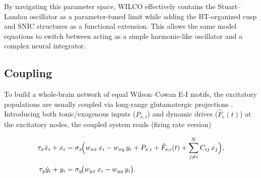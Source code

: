 \documentclass[11pt]{article}
\numberwithin{equation}{section}
\begin{document}
{By navigating this parameter space, WILCO effectively contains the Stuart–Landau oscillator as a parameter-tuned limit while adding the BT-organized cusp and SNIC structures as a functional extension. This allows the same model equations to switch between acting as a simple harmonic-like oscillator and a complex neural integrator.
}



\subsection{Coupling}

To build a whole-brain network of equal Wilson–Cowan E-I  motifs,  the excitatory populations are usually coupled via long-range glutamatergic projections \cite{castaldo2023multi}.  Introducing both tonic/exogenous inputs ($P_{x,i}$) and dynamic drives ($\hat F_e(t)$) at the excitatory nodes, the coupled system reads (firing rate version)
\begin{tcolorbox}[
  colback=gray!5,
  colframe=gray!5, %
  boxrule=0pt,
  enhanced, sharp corners,
  left=4pt, right=4pt, top=3pt, bottom=3pt,
  boxsep=2pt,
  before skip=6pt, after skip=6pt
]
\begin{equation} 
\begin{aligned}
  \tau_x \dot{x}_i + x_i 
    &= \sigma_x\!\Bigl(
         w_{xx}\,x_i 
       - w_{xy}\,y_i 
        + P_{x,i} 
       + \hat F_{e;i}(t) + \sum_{j\neq i }^N C_{ij}\,x_j\Bigr)
       ,
  \label{eq:WILCO_net_x}\\[4pt]
  \tau_y \dot{y}_i + y_i 
    &= \sigma_y\!\bigl(
         w_{yx}\,x_i 
       - w_{yy}\,y_i
       \bigr).
\end{aligned}
\end{equation}
\end{tcolorbox}
\end{document}
